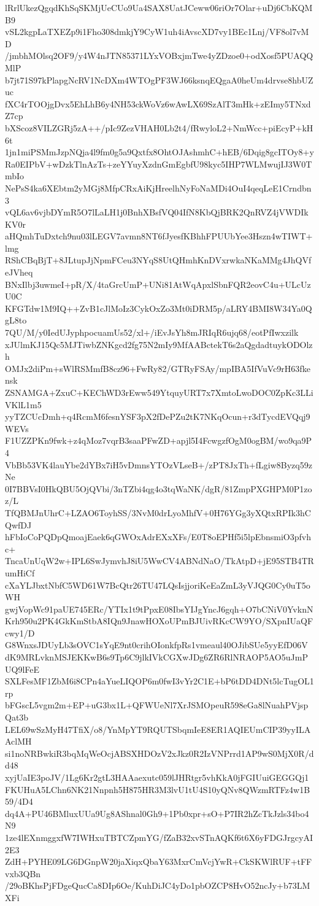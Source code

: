 lRrlUkezQgqdKhSqSKMjUeCUo9Ua4SAX8UatJCeww06riOr7Olar+uDj6CbKQMB9
vSL2kgpLaTXEZp9i1Fho308dmkjY9CyW1uh4iAvscXD7vy1BEc1Lnj/VF8ol7vMD
/jmbhMOlsq2OF9/y4W4nJTN85371LYxVOBxjmTwe4yZDzoe0+odXosf5PUAQQMlP
b7jt71S97kPlapgNcRV1NcDXm4WTOgPF3WJ66ksnqEQgaA0heUm4drvse8hbUZuc
fXC4rTOOjgDvx5EhLhB6y4NH53ckWoVz6wAwLX69SzAlT3mHk+zEImy5TNxdZ7cp
bXScoz8VILZGRj5zA++/pIc9ZezVHAH0Lb2t4/fRwyloL2+NmWcc+piEcyP+kH6t
1jn1miPSMmJzpNQja4l9fm0g5a9Qxtfx8OhtOJAshmhC+hEB/6Dqig8gcITOy8+y
Ra0EIPbV+wDzkTlnAzTs+zeYYuyXzdnGmEgbfU98kyc5IHP7WLMwujIJ3W0TmbIo
NePsS4ka6XEbtm2yMGj8MfpCRxAiKjHreelhNyFoNaMDi4OuI4qeqLeE1Crndbn3
vQL6av6vjbDYmR5O7lLaLH1j0BnhXBsfVQ04IfN8KbQjBRK2QnRVZ4jVWDIkKV0r
aHQmhTuDxtch9nu03lLEGV7avmn8NT6fJyesfKBhhFPUUbYee3Hszn4wTIWT+lmg
RShCBqBjT+8JLtupJjNpmFCeu3NYqS8UtQHmhKnDVxrwkaNKaMMg4JhQVfeJVheq
BNxIlbj3uwmeI+pR/X/4taGrcUmP+UNi81AtWqApxlSbnFQR2eovC4u+ULcUzU0C
KFGTdw1M9IQ++ZvB1cJlMoIz3CykOxZo3Mt0iDRM5p/aLRY4BMI8W34Ya0QgL8to
7QU/M/y0IedUJyphpocuamUs52/xl+/iEvJsYh8mJRIqR6ujq68/eotPfIwxzilk
xJUlmKJ15Qc5MJTiwbZNKgcd2fg75N2mIy9MfAABctekT6s2aQgdadtuykODOlzh
OMJx2diPm+sWlRSMmfB8cz96+FwRy82/GTRyFSAy/mpIBA5IfVuVc9rH63fkensk
ZSNAMGA+ZxuC+KEChWD3rEww549YtquyURT7x7XmtoLwoDOC0ZpKc3LLiVKlL1m5
yyTZCUcDmh+q4RcmM6fesnYSF3pX2fDePZu2tK7NKqOcun+r3dTycdEVQqj9WEVs
F1UZZPKn9fwk+z4qMoz7vqrB3saaPFwZD+apjl5I4FcwgzfOgM0ogBM/wo9qa9P4
VbBb53VK4lauYbe2dYBx7iH5vDmnsYTOzVLseB+/zPT8JxTh+fLgiw8Byzq59zNe
0I7BBVsI0HkQBU5OjQVbi/3nTZbi4qg4o3tqWaNK/dgR/81ZmpPXGHPM0P1zoz/L
TfQBMJnUhrC+LZAO6ToyhSS/3NvM0drLyoMhfV+0H76YGg3yXQtxRPIk3hCQwfDJ
hFbIoCoPQDpQmoajEaek6qGWOxAdrEXxXFs/E0T8oEPHf5i5lpEbnsmiO3pfvhc+
TncaUnUqW2w+IPL6SwJymvhJ8iU5WwCV4ABNdNaO/TkAtpD+jE95STB4TRumHiCf
cXaYLJbxtNbfC5WD61W7BcQtr26TU47LQsIsjjoriKeEaZmL3yVJQG0Cy0uT5oWH
gwjVopWc91paUE745ERc/YTIx1t9tPpxE08IbsYIJgYncJ6gqh+O7bCNiV0YvknN
Krh950u2PK4GkKmStbA8IQn9JnawHOXoUPmBJUivRKcCW9YO/SXpnIUaQFcwy1/D
G8WnxsJDUyLb3sOVC1sYqE9nt0crihOIonkfpRs1vmeaul40OJibSUe5yyEfD06V
dK9MRLvknMSJEKKwB6s9Tp6C9jlkIVkCGXwJDg6ZR6RlNRAOP5AO5uJmPUQ9lFeE
SXLFesMF1ZbM6i8CPn4aYueLIQOP6m0fwI3vYr2C1E+bP6tDD4DNt5lcTugOL1rp
bFGscL5vgm2m+EP+uG3bx1L+QFWUeNl7XrJSMOpeuR598eGa8lNuahPVjspQat3b
LEL69wSzMyH47TfiX/o8/YnMpYT9RQUTSbqmIeE8ER1AQIEUmCIP39yyILAAclMH
si1noNRBwkiR3bqMqWeOcjABSXHDOzV2xJkz0R2IzVNPrrd1AP9wS0MjX0R/dd48
xyjUaIE3poJV/1Lg6Kr2gtL3HAAaexutc059lJHRtgr5vhKkA0jFGIUuiGEGGQj1
FKUHuA5LChn6NK21Nnpnh5H875HR3M3lvU1tU4S10yQNv8QWzmRTFz4w1B59/4D4
dq4A+PU46BMluxUUa9Ug8AShnal0Gh9+1Pb0xpr+sO+P7IR2hZcTkJzls34bo4N9
1ze4lEXnmggxfW7IWHxuTBTCZpmYG/fZaB32xvSTnAQKf6t6X6yFDGJrgcyAI2E3
ZdH+PYHE09LG6DGnpW20jaXiqxQbaY63MxrCmVcjYwR+CkSKWlRUF+tFFvxb3QBn
/29oBKhsPjFDgeQucCa8DIp6Oe/KuhDiJC4yDo1pbOZCP8HvO52ncJy+b73LMXFi
